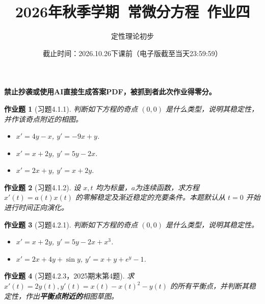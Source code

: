 \documentclass[UTF8,fontset=windows,12pt]{ctexart}
\theoremstyle{kaiti-theorem}
\newtheorem{problem}{作业题}
\numberwithin{equation}{section}
\newcommand{\R}{\mathbb{R}}
\newcommand{\bds}[1]{\boldsymbol{#1}}  %
\newcommand{\xx}{{\bds{x}}}
\newcommand{\ff}{\bds{f}}
\begin{document}
\title{\LARGE{\bf  2026年秋季学期~常微分方程~作业四}}
\author{定性理论初步}
\date{截止时间：2026.10.26下课前（电子版截至当天23:59:59）}

\maketitle

\textbf{禁止抄袭或使用AI直接生成答案PDF，被抓到者此次作业得零分。}


\begin{problem}[习题4.1.1]
判断如下方程的奇点 $(0,0)$ 是什么类型，说明其稳定性，并作该奇点附近的相图。
\begin{itemize}
\item [(1)] $x'=4y-x$, $y'=-9x+y$. 
\item [(2)] $x'=x+2y$, $y'=5y-2x$.
\item [(3)] $x'=2x+y$, $y'=x+2y$.
\end{itemize}
\end{problem}

\begin{problem}[习题4.1.2]
设 $x,t$ 均为标量，$a$为连续函数，求方程 $x'(t)=a(t)x(t)$ 的零解稳定及渐近稳定的充要条件。本题默认从 $t=0$ 开始进行时间正向演化。
\end{problem}

\begin{problem}[习题4.2.1] 
判断如下方程的奇点 $(0,0)$ 是什么类型，说明其稳定性。
\begin{itemize}
\item [(2)] $x'=x+2y$, $y'=5y-2x+x^3$.
\item [(3)] $x'=2x+4y+\sin y$, $y'=x+y+e^y-1$.
\end{itemize}
\end{problem}


\begin{problem}[习题4.2.3，2025期末第4题]
求 $x'(t)=2y(t), y'(t)=x(t)-x(t)^2-y(t)$ 的所有平衡点，并判断其稳定性，作出\textbf{平衡点附近的}相图草图。
\end{problem}
\end{document}
